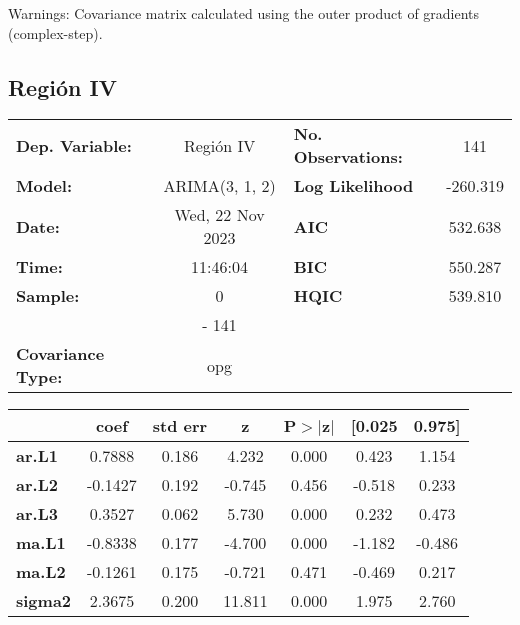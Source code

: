 \documentclass{article}%
\begin{document}
Warnings: \newline
 [1] Covariance matrix calculated using the outer product of gradients (complex-step).%
\subsection*{Región IV}%
\begin{center}
\begin{tabular}{lclc}
\toprule
\textbf{Dep. Variable:}          &    Región IV     & \textbf{  No. Observations:  } &    141      \\
\textbf{Model:}                  &  ARIMA(3, 1, 2)  & \textbf{  Log Likelihood     } &  -260.319   \\
\textbf{Date:}                   & Wed, 22 Nov 2023 & \textbf{  AIC                } &  532.638    \\
\textbf{Time:}                   &     11:46:04     & \textbf{  BIC                } &  550.287    \\
\textbf{Sample:}                 &        0         & \textbf{  HQIC               } &  539.810    \\
\textbf{}                        &       - 141      & \textbf{                     } &             \\
\textbf{Covariance Type:}        &       opg        & \textbf{                     } &             \\
\bottomrule
\end{tabular}
\begin{tabular}{lcccccc}
                & \textbf{coef} & \textbf{std err} & \textbf{z} & \textbf{P$> |$z$|$} & \textbf{[0.025} & \textbf{0.975]}  \\
\midrule
\textbf{ar.L1}  &       0.7888  &        0.186     &     4.232  &         0.000        &        0.423    &        1.154     \\
\textbf{ar.L2}  &      -0.1427  &        0.192     &    -0.745  &         0.456        &       -0.518    &        0.233     \\
\textbf{ar.L3}  &       0.3527  &        0.062     &     5.730  &         0.000        &        0.232    &        0.473     \\
\textbf{ma.L1}  &      -0.8338  &        0.177     &    -4.700  &         0.000        &       -1.182    &       -0.486     \\
\textbf{ma.L2}  &      -0.1261  &        0.175     &    -0.721  &         0.471        &       -0.469    &        0.217     \\
\textbf{sigma2} &       2.3675  &        0.200     &    11.811  &         0.000        &        1.975    &        2.760     \\

\end{tabular}
\end{center}
\end{document}
